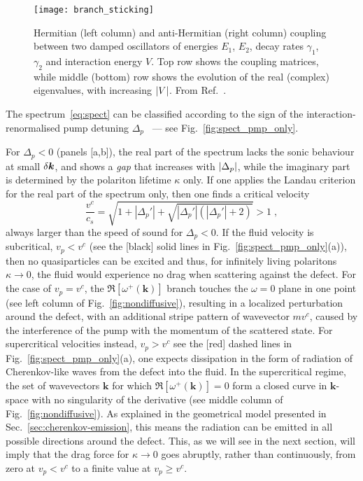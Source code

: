 %
\begin{figure}[tb]\centering
  \texttt{[image: branch\_sticking]}
  \caption{
    Hermitian (left column) and anti-Hermitian (right column) coupling
    between two damped oscillators of energies $E_1$, $E_2$, decay rates
    $\gamma_1$, $\gamma_2$ and interaction energy $V$. Top row shows the
    coupling matrices, while middle (bottom) row shows the evolution of
    the real (complex) eigenvalues, with increasing $\vert V \vert$. From
    Ref.~\cite{Ciuti_2003}.
  }\label{fig:branch-stick}
\end{figure}
% 

The spectrum~\eqref{eq:spect} can be classified according to the sign
of the interaction-renormalised pump detuning
$\Delta_p$~\cite{Carusotto_2004,Ciuti_2005} --- see
Fig.~\ref{fig:spect_pmp_only}.

For $\Delta_p<0$ (panels [a,b]), the real part of the spectrum lacks
the sonic behaviour at small $\delta \bm{k}$, and shows a \emph{gap} that
increases with $\vert \Delta_p \vert$, while the imaginary part is
determined by the polariton lifetime $\kappa$ only.
%
If one applies the Landau criterion for the real part
of the spectrum only, then one finds a critical velocity
%
\begin{equation}
  \frac{v^c}{c_s} = \sqrt{1 + |\Delta_p'| +
    \sqrt{|\Delta_p'|(|\Delta_p'| + 2)}} > 1\; ,
\label{eq:criti}
\end{equation}
%
always larger than the speed of sound for $\Delta_p<0$. 
%
If the fluid velocity is subcritical, $v_p<v^c$ (see the [black] solid
lines in Fig.~\ref{fig:spect_pmp_only}(a)), then no quasiparticles can
be excited and thus, for infinitely living polaritons $\kappa \to 0$,
the fluid would experience no drag when scattering against the
defect. 
%
For the case of $v_p = v^c$, the $\Re[\omega^{+}(\bm{k})]$ branch
touches the $\omega = 0$ plane in one point (see left column of
Fig.~\ref{fig:nondiffusive}), resulting in a localized perturbation
around the defect, with an additional stripe pattern of wavevector
$mv^c$, caused by the interference of the pump with the momentum of
the scattered state.
%
For supercritical velocities instead, $v_p > v^c$ see the [red] dashed
lines in Fig.~\ref{fig:spect_pmp_only}(a), one expects dissipation in
the form of radiation of Cherenkov-like waves from the defect into the
fluid. In the supercritical regime, the set of wavevectors $\bm{k}$
for which $\Re[\omega^{+} (\bm{k})] = 0$ form a closed curve in
$\bm{k}$-space with no singularity of the derivative (see middle
column of Fig.~\ref{fig:nondiffusive}). As explained in the
geometrical model presented in Sec.~\ref{sec:cherenkov-emission}, this
means the radiation can be emitted in all possible directions around
the defect. This, as we will see in the next section, will imply that
the drag force for $\kappa \to 0$ goes abruptly, rather than
continuously, from zero at $v_p<v^c$ to a finite value at
$v_p \ge v^c$.

